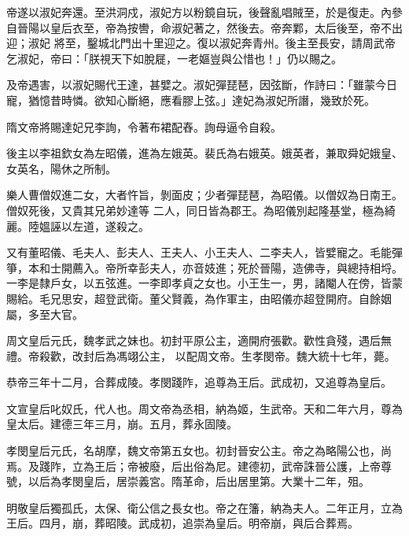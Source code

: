 \begin{pinyinscope}
 帝遂以淑妃奔還。至洪洞戍，淑妃方以粉鏡自玩，後聲亂唱賊至，於是復走。內參自晉陽以皇后衣至，帝為按轡，命淑妃著之，然後去。帝奔鄴，太后後至，帝不出迎；淑妃
 將至，鑿城北門出十里迎之。復以淑妃奔青州。後主至長安，請周武帝乞淑妃，帝曰：「朕視天下如脫屣，一老嫗豈與公惜也！」仍以賜之。



 及帝遇害，以淑妃賜代王達，甚嬖之。淑妃彈琵琶，因弦斷，作詩曰：「雖蒙今日寵，猶憶昔時憐。欲知心斷絕，應看膠上弦。」達妃為淑妃所譖，幾致於死。



 隋文帝將賜達妃兄李詢，令著布裙配舂。詢母逼令自殺。



 後主以李祖欽女為左昭儀，進為左娥英。裴氏為右娥英。娥英者，兼取舜妃娥皇、女英名，陽休之所制。



 樂人曹僧奴進二女，大者忤旨，剝面皮；少者彈琵琶，為昭儀。以僧奴為日南王。僧奴死後，又貴其兄弟妙達等
 二人，同日皆為郡王。為昭儀別起隆基堂，極為綺麗。陸媼誣以左道，遂殺之。



 又有董昭儀、毛夫人、彭夫人、王夫人、小王夫人、二李夫人，皆嬖寵之。毛能彈箏，本和士開薦入。帝所幸彭夫人，亦音妓進；死於晉陽，造佛寺，與總持相埒。一李是隸戶女，以五弦進。一李即孝貞之女也。小王生一，男，諸閹人在傍，皆蒙賜給。毛兄思安，超登武衛。董父賢義，為作軍主，由昭儀亦超登開府。自餘姻屬，多至大官。



 周文皇后元氏，魏孝武之妹也。初封平原公主，適開府張歡。歡性貪殘，遇后無禮。帝殺歡，改封后為馮翊公主，
 以配周文帝。生孝閔帝。魏大統十七年，薨。



 恭帝三年十二月，合葬成陵。孝閔踐阼，追尊為王后。武成初，又追尊為皇后。



 文宣皇后叱奴氏，代人也。周文帝為丞相，納為姬，生武帝。天和二年六月，尊為皇太后。建德三年三月，崩。五月，葬永固陵。



 孝閔皇后元氏，名胡摩，魏文帝第五女也。初封晉安公主。帝之為略陽公也，尚焉。及踐阼，立為王后；帝被廢，后出俗為尼。建德初，武帝誅晉公護，上帝尊號，以后為孝閔皇后，居崇義宮。隋革命，后出居里第。大業十二年，殂。



 明敬皇后獨孤氏，太保、衛公信之長女也。帝之在籓，納為夫人。二年正月，立為王后。四月，崩，葬昭陵。武成初，追崇為皇后。明帝崩，與后合葬焉。




\end{pinyinscope}
